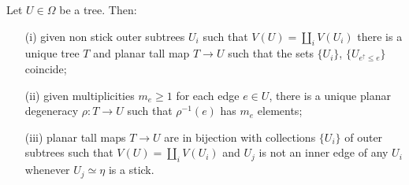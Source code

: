 \documentclass[a4paper,10pt]{article}%
\begin{document}
\begin{proposition}\label{BUILDABLE PROP}
	Let $U \in \Omega$ be a tree. Then:
\begin{itemize}
	\item[(i)] given non stick outer subtrees $U_i$ such that 
	$V(U) = \coprod_i V(U_i)$ there is a unique tree $T$ and planar tall map $T \to U$ such that the sets $\{U_i\}$, $\{U_{e^{\uparrow}\leq e}\}$ coincide;
	\item[(ii)] given multiplicities $m_e \geq 1$ for each edge $e \in U$, there is a unique planar degeneracy $\rho \colon T \to U$ such that $\rho^{-1}(e)$ has $m_e$ elements;
	\item[(iii)] planar tall maps $T \to U$ are in bijection with collections $\{U_i\}$ of outer subtrees such that $V(U) = \coprod_i V(U_i)$ and $U_j$ is not an inner edge of any $U_i$ whenever $U_j \simeq \eta$ is a stick.
\end{itemize}
\end{proposition}
\end{document}
